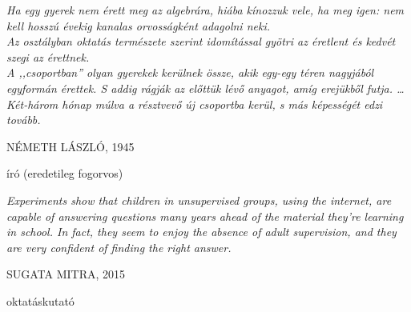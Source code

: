 \newlength\longest
\cleardoublepage
\thispagestyle{empty}
\null\vfill
\centering
\parbox{0.8\textwidth} {%
    \raggedright{\large\itshape%
    Ha egy gyerek nem érett meg az algebrára, hiába kínozzuk vele,  
    ha meg igen: nem kell hosszú évekig kanalas orvosságként adagolni neki. \\
    Az osztályban oktatás természete szerint idomítással gyötri az éretlent 
    és kedvét szegi az érettnek. \\
    A ,,csoportban'' olyan gyerekek kerülnek össze, akik egy-egy téren 
    nagyjából egyformán érettek. S addig rágják az előttük lévő anyagot, amíg erejükből futja. \ldots Két-három hónap múlva a résztvevő új csoportba kerül, s más képességét edzi tovább.

        \par\bigskip
    }
    \raggedleft\Large\MakeUppercase{Németh László, 1945}\par%
    \raggedleft\normalsize{író (eredetileg fogorvos)}\par%
}
\vfill\vfill
\cleardoublepage
\thispagestyle{empty}
\null\vfill
\centering
\parbox{0.8\textwidth} {%
    \raggedright{\large\itshape%
    Experiments show that children in unsupervised groups, using the internet, are capable of answering questions many years ahead of the material they’re learning in school. In fact, they seem to enjoy the absence of adult supervision, and they are very confident of finding the right answer.

        \par\bigskip
    }
    \raggedleft\Large\MakeUppercase{Sugata Mitra, 2015}\par%
    \raggedleft\normalsize{oktatáskutató}\par%
}
\vfill\vfill


